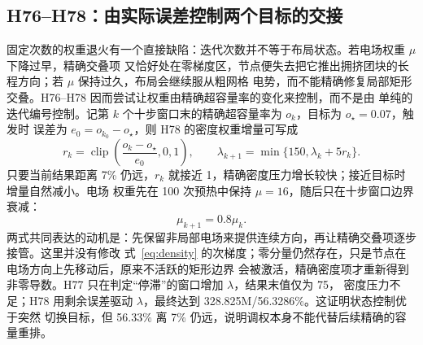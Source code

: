 \documentclass[UTF8,a4paper,11pt]{ctexrep}
\begin{document}
\subsection{H76--H78：由实际误差控制两个目标的交接}
固定次数的权重退火有一个直接缺陷：迭代次数并不等于布局状态。若电场权重 $\mu$ 下降过早，精确交叠项
又恰好处在零梯度区，节点便失去把它推出拥挤团块的长程方向；若 $\mu$ 保持过久，布局会继续服从粗网格
电势，而不能精确修复局部矩形交叠。H76--H78 因而尝试让权重由精确超容量率的变化来控制，而不是由
单纯的迭代编号控制。记第 $k$ 个十步窗口末的精确超容量率为 $o_k$，目标为 $o_\star=0.07$，触发时
误差为 $e_0=o_{k_0}-o_\star$，则 H78 的密度权重增量可写成
\begin{equation}
r_k=\operatorname{clip}\!\left(\frac{o_k-o_\star}{e_0},0,1\right),\qquad
\lambda_{k+1}=\min\{150,\lambda_k+5r_k\}.
\label{eq:h78lambda}
\end{equation}
只要当前结果距离 7\% 仍远，$r_k$ 就接近 1，精确密度压力增长较快；接近目标时增量自然减小。电场
权重先在 100 次预热中保持 $\mu=16$，随后只在十步窗口边界衰减：
\begin{equation}
\mu_{k+1}=0.8\mu_k .
\label{eq:h78mu}
\end{equation}
两式共同表达的动机是：先保留非局部电场来提供连续方向，再让精确交叠项逐步接管。这里并没有修改
式~\eqref{eq:density} 的次梯度；零分量仍然存在，只是节点在电场方向上先移动后，原来不活跃的矩形边界
会被激活，精确密度项才重新得到非零导数。H77 只在判定“停滞”的窗口增加 $\lambda$，结果末值仅为 75，
密度压力不足；H78 用剩余误差驱动 $\lambda$，最终达到 328.825M/56.3286\%。这证明状态控制优于突然
切换目标，但 56.33\% 离 7\% 仍远，说明调权本身不能代替后续精确的容量重排。
\end{document}

